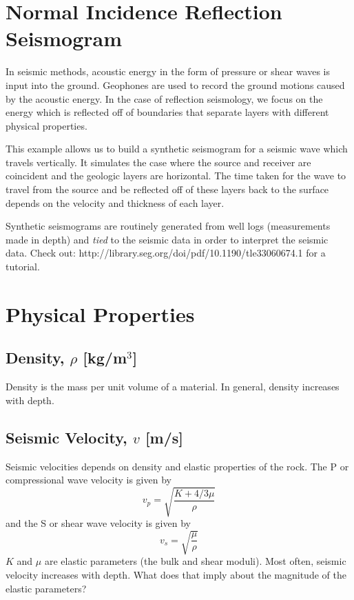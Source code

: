 \documentclass{article}[11pt,oneside]
\begin{document}

\section*{Normal Incidence Reflection Seismogram}
In seismic methods, acoustic energy in the form of pressure or shear waves is input into the ground.
Geophones are used to record the ground motions caused by the acoustic energy. In the case of reflection seismology, we focus on the energy which is reflected off of boundaries that separate layers with different physical properties.

This example allows us to build a synthetic seismogram for a seismic wave which travels vertically. It simulates the case where the source and receiver are coincident and the geologic layers are horizontal. The time taken for the wave to travel from the source and be reflected off of these layers back to the surface depends on the velocity and thickness of each layer.

Synthetic seismograms are routinely generated from well logs (measurements made in depth) and \emph{tied} to the seismic data in order to interpret the seismic data.
Check out: http://library.seg.org/doi/pdf/10.1190/tle33060674.1 for a tutorial.


\section*{Physical Properties}
\subsection*{Density, $\rho$ [kg/m$^3$]}
Density is the mass per unit volume of a material. In general, density increases with depth.

\subsection*{Seismic Velocity, $v$ [m/s]}
Seismic velocities depends on density and elastic properties of the rock. The P or compressional wave velocity is given by
$$v_p = \sqrt{\frac{K + 4/3\mu}{\rho}}$$
and the S or shear wave velocity is given by
$$v_s = \sqrt{\frac{\mu}{\rho}}$$
$K$ and $\mu$ are elastic parameters (the bulk and shear moduli). Most often, seismic velocity increases with depth. What does that imply about the magnitude of the elastic parameters?
\end{document}
